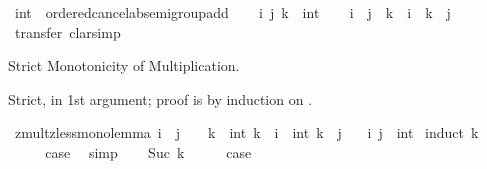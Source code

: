 \begin{isabellebody}
%
\endisatagdocument
{\isafolddocument}%
%
\isadelimdocument
%
\endisadelimdocument
{}\isamarkupfalse%
\ int\ {\isacharcolon}{\kern0pt}{\isacharcolon}{\kern0pt}\ ordered{\isacharunderscore}{\kern0pt}cancel{\isacharunderscore}{\kern0pt}ab{\isacharunderscore}{\kern0pt}semigroup{\isacharunderscore}{\kern0pt}add\isanewline
%
\isadelimproof
%
\endisadelimproof
%
\isatagproof
{}\isamarkupfalse%
\isanewline
\ \ \isamarkupfalse%
\ i\ j\ k\ {\isacharcolon}{\kern0pt}{\isacharcolon}{\kern0pt}\ int\isanewline
\ \ \isamarkupfalse%
\ {\isachardoublequoteopen}i\ {\isasymle}\ j\ {\isasymLongrightarrow}\ k\ {\isacharplus}{\kern0pt}\ i\ {\isasymle}\ k\ {\isacharplus}{\kern0pt}\ j{\isachardoublequoteclose}\isanewline
\ \ \ \ \isamarkupfalse%
\ transfer\ clarsimp\isanewline
{}\isamarkupfalse%
%
\endisatagproof
{\isafoldproof}%
%
\isadelimproof
%
\endisadelimproof
%
\begin{isamarkuptext}%
Strict Monotonicity of Multiplication.%
\end{isamarkuptext}\isamarkuptrue%
%
\begin{isamarkuptext}%
Strict, in 1st argument; proof is by induction on .%
\end{isamarkuptext}\isamarkuptrue%
\isamarkupfalse%
\ zmult{\isacharunderscore}{\kern0pt}zless{\isacharunderscore}{\kern0pt}mono{}{\isacharunderscore}{\kern0pt}lemma{\isacharcolon}{\kern0pt}\ {\isachardoublequoteopen}i\ {\isacharless}{\kern0pt}\ j\ {\isasymLongrightarrow}\ {}\ {\isacharless}{\kern0pt}\ k\ {\isasymLongrightarrow}\ int\ k\ {\isacharasterisk}{\kern0pt}\ i\ {\isacharless}{\kern0pt}\ int\ k\ {\isacharasterisk}{\kern0pt}\ j{\isachardoublequoteclose}\isanewline
\ \ \ i\ j\ {\isacharcolon}{\kern0pt}{\isacharcolon}{\kern0pt}\ int\isanewline
%
\isadelimproof
%
\endisadelimproof
%
\isatagproof
{}\isamarkupfalse%
\ {\isacharparenleft}{\kern0pt}induct\ k{\isacharparenright}{\kern0pt}\isanewline
\ \ \isamarkupfalse%
\ {}\isanewline
\ \ \isamarkupfalse%
\ \isamarkupfalse%
\ {\isacharquery}{\kern0pt}case\ \isamarkupfalse%
\ simp\isanewline
{}\isamarkupfalse%
\isanewline
\ \ \isamarkupfalse%
\ {\isacharparenleft}{\kern0pt}Suc\ k{\isacharparenright}{\kern0pt}\isanewline
\ \ \isamarkupfalse%
\ \isamarkupfalse%
\ {\isacharquery}{\kern0pt}case\isanewline

\end{isabellebody}
